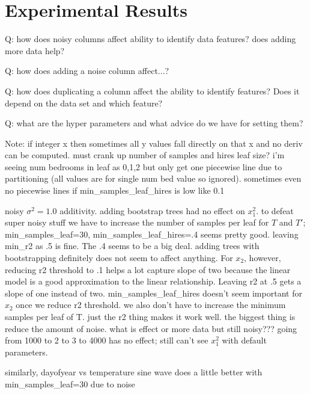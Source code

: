 \documentclass[12pt]{article}
\begin{document}

\section{Experimental Results}\label{sec:applications}

Q: how does noisy columns affect ability to identify data features? does adding more data help?

Q: how does adding a noise column affect...?

Q: how does duplicating a column affect the ability to identify features? Does it depend on the data set and which feature?

Q: what are the hyper parameters and what advice do we have for setting them?

Note: if integer x then sometimes all y values fall directly on that x and no deriv can be computed.  must crank up number of samples and hires leaf size? i'm seeing num bedrooms in leaf as 0,1,2 but only get one piecewise line due to partitioning (all values are for single num bed value so ignored). sometimes even no piecewise lines if min\_samples\_leaf\_hires is low like 0.1

noisy $\sigma^2 = 1.0$ additivity. adding bootstrap trees had no effect on $x_1^2$.  to defeat super noisy stuff we have to increase the number of samples per leaf for $T$ and $T'$; min\_samples\_leaf=30, min\_samples\_leaf\_hires=.4 seems pretty good.  leaving min\_r2 as .5 is fine.  The .4 seems to be a big deal.   adding trees with bootstrapping definitely does not seem to affect anything.  For $x_2$, however, reducing r2 threshold to .1 helps a lot capture slope of two because the linear model is a good approximation to the linear relationship. Leaving r2 at .5 gets a slope of one instead of two. min\_samples\_leaf\_hires doesn't seem important for $x_2$ once we reduce r2 threshold. we also don't have to increase the minimum samples per leaf of T. just the r2 thing makes it work well. the biggest thing is reduce the amount of noise. what is effect or more data but still noisy??? going from 1000 to 2 to 3 to 4000 has no effect; still can't see $x_1^2$ with  default parameters.

similarly, dayofyear vs temperature sine wave does a little better with min\_samples\_leaf=30 due to noise
\end{document}
